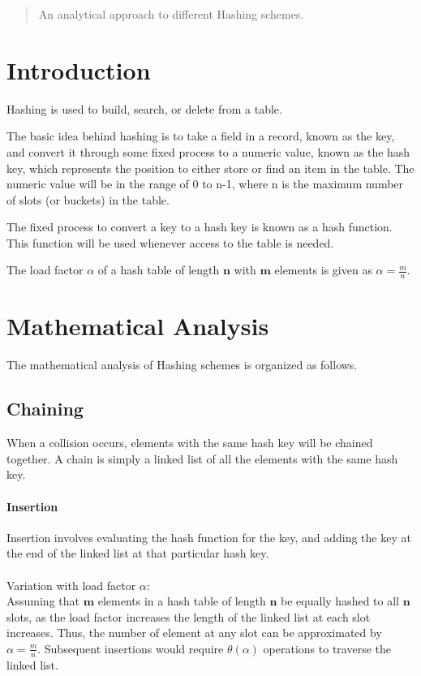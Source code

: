 \documentclass[12pt]{article}
\begin{document}
\maketitle

\begin{abstract}
An analytical approach to different Hashing schemes.
\end{abstract}

\section{Introduction}
Hashing is used to build, search, or delete from a table.

The basic idea behind hashing is to take a field in a record, known as the key, and convert it through some fixed process to a numeric value, known as the hash key, which represents the position to either store or find an item in the table. The numeric value will be in the range of 0 to n-1, where n is the maximum number of slots (or buckets) in the table.

The fixed process to convert a key to a hash key is known as a hash function. This function will be used whenever access to the table is needed.


The load factor $\alpha$ of a hash table of length $\mathbf{n}$ with $\mathbf{m}$ elements is given as $\alpha=\frac{m}{n}$.
\section{Mathematical Analysis}
The mathematical analysis of Hashing schemes is organized as follows.

\subsection{Chaining}\label{Hashing by Chaining}
When a collision occurs, elements with the same hash key will be chained together. A chain is simply a linked list of all the elements with the same hash key.
\paragraph{Insertion}
Insertion involves evaluating the hash function for the key, and adding the key at the end of the linked list at that particular hash key.\\ \\
Variation with load factor $\alpha$:\\
Assuming that $\mathbf{m}$ elements in a hash table of length $\mathbf{n}$ be equally hashed to all $\mathbf{n}$ slots, as the load factor increases the length of the linked list at each slot increases. Thus, the number of element at any slot can be approximated by $\alpha=\frac{m}{n}$. Subsequent insertions would require $\theta(\alpha)$ operations to traverse the linked list. 
\end{document}
